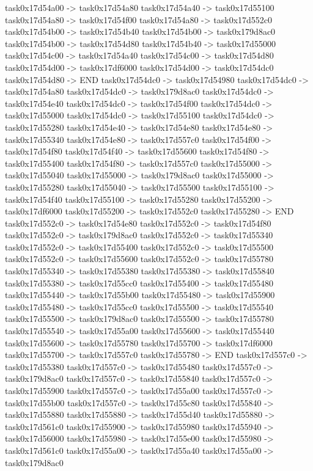 {	task0x17d54a00 -> task0x17d54a80
	task0x17d54a40 -> task0x17d55100
	task0x17d54a80 -> task0x17d54f00
	task0x17d54a80 -> task0x17d552c0
	task0x17d54b00 -> task0x17d54b40
	task0x17d54b00 -> task0x179d8ac0
	task0x17d54b00 -> task0x17d54d80
	task0x17d54b40 -> task0x17d55000
	task0x17d54c00 -> task0x17d54a40
	task0x17d54c00 -> task0x17d54d80
	task0x17d54d00 -> task0x17df6000
	task0x17d54d00 -> task0x17d54dc0
	task0x17d54d80 -> END
	task0x17d54dc0 -> task0x17d54980
	task0x17d54dc0 -> task0x17d54a80
	task0x17d54dc0 -> task0x179d8ac0
	task0x17d54dc0 -> task0x17d54e40
	task0x17d54dc0 -> task0x17d54f00
	task0x17d54dc0 -> task0x17d55000
	task0x17d54dc0 -> task0x17d55100
	task0x17d54dc0 -> task0x17d55280
	task0x17d54e40 -> task0x17d54e80
	task0x17d54e80 -> task0x17d55340
	task0x17d54e80 -> task0x17d557c0
	task0x17d54f00 -> task0x17d54f80
	task0x17d54f40 -> task0x17d55600
	task0x17d54f80 -> task0x17d55400
	task0x17d54f80 -> task0x17d557c0
	task0x17d55000 -> task0x17d55040
	task0x17d55000 -> task0x179d8ac0
	task0x17d55000 -> task0x17d55280
	task0x17d55040 -> task0x17d55500
	task0x17d55100 -> task0x17d54f40
	task0x17d55100 -> task0x17d55280
	task0x17d55200 -> task0x17df6000
	task0x17d55200 -> task0x17d552c0
	task0x17d55280 -> END
	task0x17d552c0 -> task0x17d54e80
	task0x17d552c0 -> task0x17d54f80
	task0x17d552c0 -> task0x179d8ac0
	task0x17d552c0 -> task0x17d55340
	task0x17d552c0 -> task0x17d55400
	task0x17d552c0 -> task0x17d55500
	task0x17d552c0 -> task0x17d55600
	task0x17d552c0 -> task0x17d55780
	task0x17d55340 -> task0x17d55380
	task0x17d55380 -> task0x17d55840
	task0x17d55380 -> task0x17d55cc0
	task0x17d55400 -> task0x17d55480
	task0x17d55440 -> task0x17d55b00
	task0x17d55480 -> task0x17d55900
	task0x17d55480 -> task0x17d55cc0
	task0x17d55500 -> task0x17d55540
	task0x17d55500 -> task0x179d8ac0
	task0x17d55500 -> task0x17d55780
	task0x17d55540 -> task0x17d55a00
	task0x17d55600 -> task0x17d55440
	task0x17d55600 -> task0x17d55780
	task0x17d55700 -> task0x17df6000
	task0x17d55700 -> task0x17d557c0
	task0x17d55780 -> END
	task0x17d557c0 -> task0x17d55380
	task0x17d557c0 -> task0x17d55480
	task0x17d557c0 -> task0x179d8ac0
	task0x17d557c0 -> task0x17d55840
	task0x17d557c0 -> task0x17d55900
	task0x17d557c0 -> task0x17d55a00
	task0x17d557c0 -> task0x17d55b00
	task0x17d557c0 -> task0x17d55c80
	task0x17d55840 -> task0x17d55880
	task0x17d55880 -> task0x17d55d40
	task0x17d55880 -> task0x17d561c0
	task0x17d55900 -> task0x17d55980
	task0x17d55940 -> task0x17d56000
	task0x17d55980 -> task0x17d55e00
	task0x17d55980 -> task0x17d561c0
	task0x17d55a00 -> task0x17d55a40
	task0x17d55a00 -> task0x179d8ac0
}
